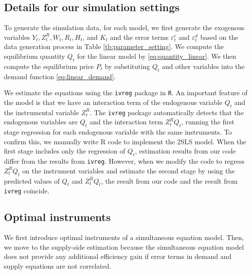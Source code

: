 \documentclass[11pt, a4paper]{article}
\begin{document}
\subsection{Details for our simulation settings}

To generate the simulation data, for each model, we first generate the exogenous variables $Y_{t}, Z^{R}_{t}, W_{t}, R_{t}, H_{t}$, and $K_{t}$ and the error terms $\varepsilon_{t}^c$ and $\varepsilon_{t}^d$ based on the data generation process in Table \ref{tb:parameter_setting}.
We compute the equilibrium quantity $Q_{t}$ for the linear model by \eqref{eq:quantity_linear}.
We then compute the equilibrium price $P_{t}$ by substituting $Q_{t}$ and other variables into the demand function \eqref{eq:linear_demand}.

We estimate the equations using the \texttt{ivreg} package in \texttt{R}.
An important feature of the model is that we have an interaction term of the endogenous variable $Q_{t}$ and the instrumental variable $Z^{R}_{t}$.
The \texttt{ivreg} package automatically detects that the endogenous variables are $Q_{t}$ and the interaction term $Z^{R}_{t}Q_{t}$, running the first stage regression for each endogenous variable with the same instruments. To confirm this, we manually write R code to implement the 2SLS model. 
When the first stage includes only the regression of $Q_{t}$, estimation results from our code differ from the results from \texttt{ivreg}. 
However, when we modify the code to regress $Z^{R}_{t}Q_{t}$ on the instrument variables and estimate the second stage by using the predicted values of $Q_{t}$ and $Z^{R}_{t}Q_{t}$, the result from our code and the result from \texttt{ivreg} coincide.





\subsection{Optimal instruments}\label{sec:optimal_instruments}
We first introduce optimal instruments of a simultaneous equation model. 
Then, we move to the supply-side estimation because the simultaneous equation model does not provide any additional efficiency gain if error terms in demand and supply equations are not correlated.
\end{document}
